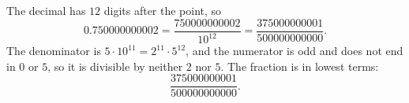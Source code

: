 The decimal has $12$ digits after the point, so
\[0.750000000002=\dfrac{750000000002}{10^{12}}=\dfrac{375000000001}{500000000000}.\]
The denominator is $5\cdot10^{11}=2^{11}\cdot5^{12}$, and the numerator is odd and does not end in $0$ or $5$, so it is divisible by neither $2$ nor $5$. The fraction is in lowest terms:
\[\boxed{\dfrac{375000000001}{500000000000}}.\]
